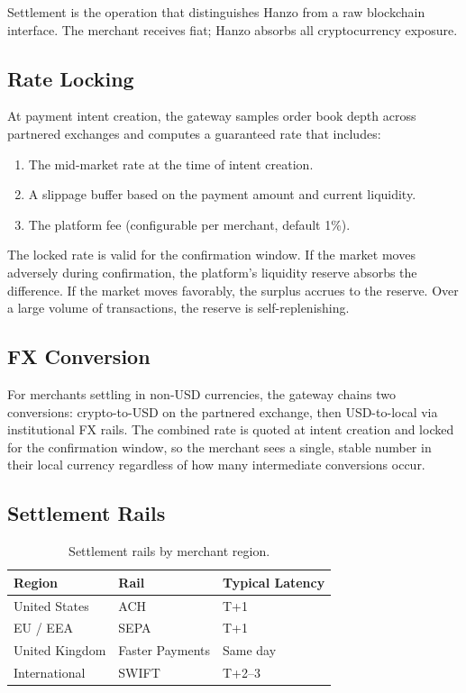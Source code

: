 \documentclass[11pt,letterpaper]{article}
\begin{document}
Settlement is the operation that distinguishes Hanzo from a raw blockchain
interface.  The merchant receives fiat; Hanzo absorbs all cryptocurrency
exposure.

\subsection{Rate Locking}

At payment intent creation, the gateway samples order book depth across
partnered exchanges and computes a guaranteed rate that includes:

\begin{enumerate}[leftmargin=1.1em]
    \item The mid-market rate at the time of intent creation.
    \item A slippage buffer based on the payment amount and current liquidity.
    \item The platform fee (configurable per merchant, default 1\%).
\end{enumerate}

The locked rate is valid for the confirmation window.  If the market moves
adversely during confirmation, the platform's liquidity reserve absorbs the
difference.  If the market moves favorably, the surplus accrues to the
reserve.  Over a large volume of transactions, the reserve is
self-replenishing.

\subsection{FX Conversion}

For merchants settling in non-USD currencies, the gateway chains two
conversions: crypto-to-USD on the partnered exchange, then USD-to-local via
institutional FX rails.  The combined rate is quoted at intent creation and
locked for the confirmation window, so the merchant sees a single, stable
number in their local currency regardless of how many intermediate conversions
occur.

\subsection{Settlement Rails}

\begin{table}[H]
\centering
\small
\begin{tabular}{lll}
\toprule
\textbf{Region} & \textbf{Rail} & \textbf{Typical Latency} \\
\midrule
United States & ACH & T+1 \\
EU / EEA & SEPA & T+1 \\
United Kingdom & Faster Payments & Same day \\
International & SWIFT & T+2--3 \\
\bottomrule
\end{tabular}
\caption{Settlement rails by merchant region.}
\label{tab:settlement}
\end{table}
\end{document}
